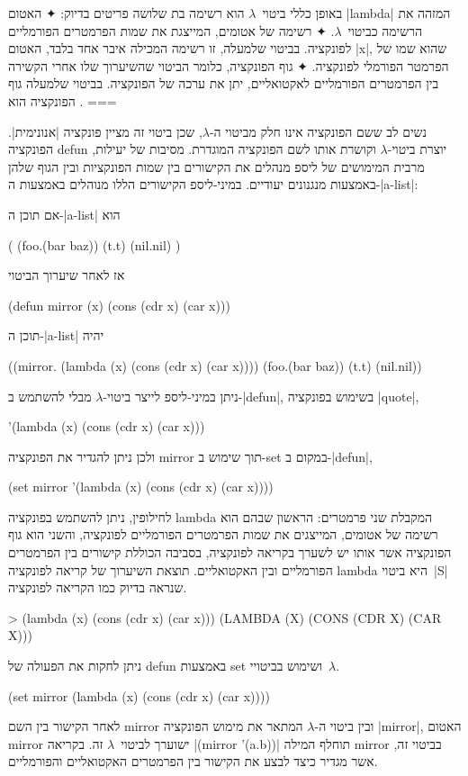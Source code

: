 באופן כללי ביטוי~$λ$ הוא רשימה בת שלושה פריטים בדיוק:
✦ האטום \T|lambda| המזהה את הרשימה כביטוי~$λ$.
✦ רשימה של אטומים, המייצגת את שמות הפרמטרים הפורמליים לפונקציה. בביטוי שלמעלה,
זו רשימה המכילה איבר אחד בלבד, האטום \E|x|, שהוא שמו של הפרמטר הפורמלי
לפונקציה.
✦ גוף הפונקציה, כלומר הביטוי שהשיערוך שלו אחרי הקשירה בין הפרמטרים
הפורמליים לאקטואליים, יתן את ערכה של הפונקציה. בביטוי שלמעלה גוף הפונקציה הוא
.
===

נשים לב ששם הפונקציה אינו חלק מביטוי ה-$λ$, שכן ביטוי זה מציין פונקציה
\ע|אנונימית|. הפונקציה defun יוצרת ביטוי-$λ$ וקושרת אותו לשם הפונקציה המוגדרת.
מסיבות של יעילות, מרבית המימושים של ליספ מנהלים את הקישורים בין שמות הפונקציות
ובין הגוף שלהן באמצעות מנגנונים יעודיים. במיני-ליספ הקישורים הללו מנוהלים
באמצעות ה-\E|a-list|:

אם תוכן ה-\E|a-list| הוא
\begin{LISP}
(
  (foo.(bar baz))
  (t.t)
  (nil.nil)
)
\end{LISP}
אז לאחר שיערוך הביטוי
\begin{LISP}
(defun mirror (x)
  (cons (cdr x) (car x)))
\end{LISP}
תוכן ה-\E|a-list| יהיה
\begin{LISP}
((mirror.
        (lambda (x)
        (cons (cdr x) (car x))))
     (foo.(bar baz))
     (t.t)
     (nil.nil))
\end{LISP}

ניתן במיני-ליספ לייצר ביטוי-$λ$ מבלי להשתמש ב-\E|defun|, בשימוש בפונקציה
\E|quote|,
\begin{LISP}
  '(lambda (x) (cons (cdr x) (car x)))
\end{LISP}
ולכן ניתן להגדיר את הפונקציה mirror תוך שימוש ב-set במקום ב-\E|defun|,
\begin{LISP}
(set mirror
  '(lambda (x) (cons (cdr x) (car x))))
\end{LISP}
לחילופין, ניתן להשתמש בפונקציה lambda המקבלת שני פרמטרים: הראשון שבהם הוא רשימה
של אטומים, המייצגים את שמות הפרמטרים הפורמליים לפונקציה, והשני הוא גוף הפונקציה
אשר אותו יש לשערך בקריאה לפונקציה, בסביבה הכוללת קישורים בין הפרמטרים הפורמליים
ובין האקטואליים. תוצאת השיערוך של קריאה לפונקציה lambda היא ביטוי~\E|S| שנראה
בדיוק כמו הקריאה לפונקציה.
\begin{LISP}
> (lambda (x) (cons (cdr x) (car x)))
(LAMBDA (X) (CONS (CDR X) (CAR X)))
\end{LISP}
ניתן לחקות את הפעולה של defun באמצעות set ושימוש בביטויי~$λ$.
\begin{LISP}
(set mirror
  (lambda (x) (cons (cdr x) (car x))))
\end{LISP}
לאחר הקישור בין השם mirror ובין ביטוי ה-$λ$ המתאר את מימוש הפונקציה \E|mirror|,
האטום mirror ישוערך לביטוי~$λ$ זה. בקריאה \T|(mirror '(a.b))| תוחלף המילה
mirror בביטוי זה, אשר מגדיר כיצד לבצע את הקישור בין הפרמטרים האקטואליים
והפורמליים.


